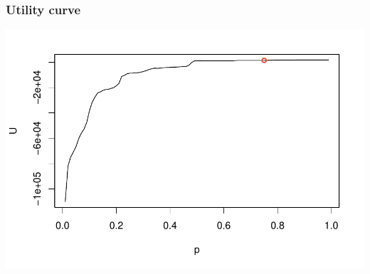 \begin{frame}
\frametitle{Utility curve}

\vspace{-5mm}

\begin{center}
\includegraphics[width=\textwidth]{8-4_logistic_reg/figures/spam/utility.pdf}
\end{center}

\end{frame}



